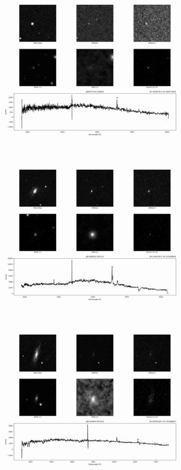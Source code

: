 \begin{figure}[H]
\begin{center}
        \includegraphics[scale = 0.10]{figuras/a4.jpg}
        \includegraphics[scale = 0.10]{figuras/a5.jpg}
        \includegraphics[scale = 0.10]{figuras/a6.jpg}
        \label{fig:my_label}
    \end{center}
\end{figure}

